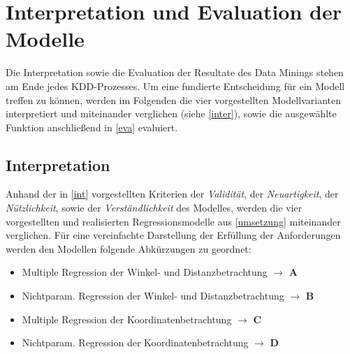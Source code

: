 \section{Interpretation und Evaluation der Modelle}
Die Interpretation sowie die Evaluation der Resultate des Data Minings stehen am Ende jedes KDD-Prozesses. Um eine fundierte Entscheidung für ein Modell treffen zu können, werden im Folgenden die vier vorgestellten Modellvarianten interpretiert und miteinander verglichen (siehe \vref{inter}), sowie die ausgewählte Funktion anschließend in \vref{eva} evaluiert.

\subsection{Interpretation}
\label{inter}
Anhand der in \vref{int} vorgestellten Kriterien der \textit{Validität}, der \textit{Neuartigkeit}, der \textit{Nützlichkeit}, sowie der \textit{Verständlichkeit} des Modelles, werden die vier vorgestellten und realisierten Regressionsmodelle aus \vref{umsetzung} miteinander verglichen. Für eine vereinfachte Darstellung der Erfüllung der Anforderungen werden den Modellen folgende Abkürzungen zu geordnet:

\begin{itemize}
\item Multiple Regression der Winkel- und Distanzbetrachtung $\rightarrow$ \textbf{A}
\item Nichtparam. Regression der Winkel- und Distanzbetrachtung $\rightarrow$ \textbf{B}
\item Multiple Regression der Koordinatenbetrachtung $\rightarrow$ \textbf{C}
\item Nichtparam. Regression der Koordinatenbetrachtung $\rightarrow$ \textbf{D}
\end{itemize}

